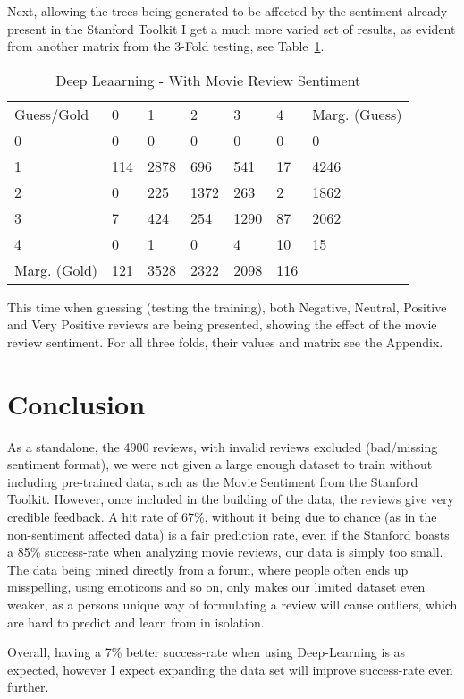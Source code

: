 \documentclass{sig-alternate}
\begin{document}
Next, allowing the trees being generated to be affected by the sentiment already present in the Stanford Toolkit I get a much more varied set of results, as evident from another matrix from the 3-Fold testing, see Table~\ref{table:deepsem}.
\begin{table}[h!]
\caption{Deep Leaarning - With Movie Review Sentiment}
\begin{tabular}{l l l l l l l}
Guess/Gold & 0 & 1 & 2 & 3 & 4 & Marg. (Guess)\\
0 & 0 & 0 & 0 & 0 & 0 & 0 \\
1 & 114 & 2878 & 696 & 541 & 17 & 4246 \\
2 & 0 & 225 & 1372 & 263 & 2 & 1862 \\ 
3 & 7 & 424 & 254 & 1290 & 87 & 2062 \\
4 &  0 & 1 & 0 & 4 & 10 & 15 \\
Marg. (Gold) & 121 & 3528 & 2322 & 2098 & 116
\end{tabular}
\label{table:deepsem}
\end{table}

This time when guessing (testing the training), both Negative, Neutral, Positive and Very Positive reviews are being presented, showing the effect of the movie review sentiment. For all three folds, their values and matrix see the Appendix.
\section{Conclusion}
As a standalone, the 4900 reviews, with invalid reviews excluded (bad/missing sentiment format), we were not given a large enough dataset to train without including pre-trained data, such as the Movie Sentiment from the Stanford Toolkit. However, once included in the building of the data, the reviews give very credible feedback. A hit rate of 67\%, without it being due to chance (as in the non-sentiment affected data) is a fair prediction rate, even if the Stanford boasts a 85\% success-rate when analyzing movie reviews, our data is simply too small. The data being mined directly from a forum, where people often ends up misspelling, using emoticons and so on, only makes our limited dataset even weaker, as a persons unique way of formulating a review will cause outliers, which are hard to predict and learn from in isolation.

Overall, having a 7\% better success-rate when using Deep-Learning is as expected, however I expect expanding the data set will improve success-rate even further.
{}  %

\balancecolumns
\appendix
\label{appendix}
\end{document}
